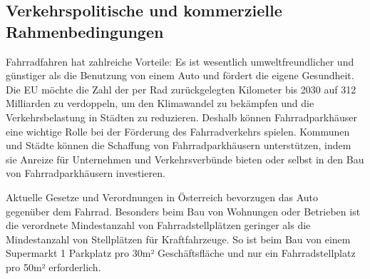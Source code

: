 \subsection{Verkehrspolitische und kommerzielle Rahmenbedingungen}

Fahrradfahren hat zahlreiche Vorteile: Es ist wesentlich umweltfreundlicher und günstiger als die Benutzung von einem Auto und fördert die eigene Gesundheit. Die EU möchte die Zahl der per Rad zurückgelegten Kilometer bis 2030 auf 312 Milliarden zu verdoppeln, um den Klimawandel zu bekämpfen und die Verkehrsbelastung in Städten zu reduzieren.  Deshalb können Fahrradparkhäuser eine wichtige Rolle bei der Förderung des Fahrradverkehrs spielen. Kommunen und Städte können die Schaffung von Fahrradparkhäusern unterstützen, indem sie Anreize für Unternehmen und Verkehrsverbünde bieten oder selbst in den Bau von Fahrradparkhäusern investieren.

\noindent Aktuelle Gesetze und Verordnungen in Österreich bevorzugen das Auto gegenüber dem Fahrrad. Besonders beim Bau von Wohnungen oder Betrieben ist die verordnete Mindestanzahl von Fahrradstellplätzen geringer als die Mindestanzahl von Stellplätzen für Kraftfahrzeuge.  So ist beim Bau von einem Supermarkt 1 Parkplatz pro 30m² Geschäftsfläche und nur ein Fahrradstellplatz pro 50m² erforderlich.\cite*{noauthor_ris_nodate}
